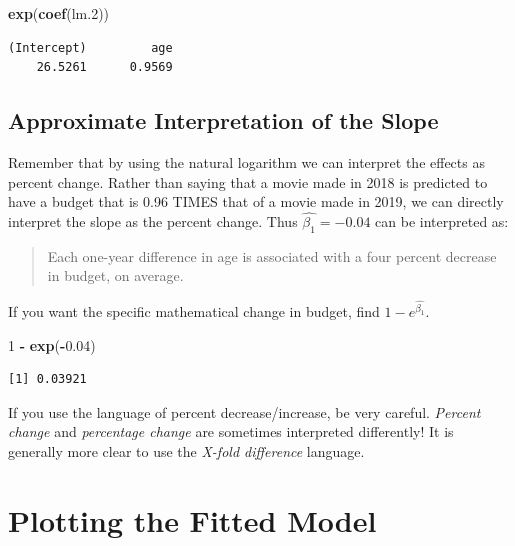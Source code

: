 \documentclass[]{book}
\newenvironment{Shaded}{\begin{snugshade}}{\end{snugshade}}
\newcommand{\DecValTok}[1]{\textcolor[rgb]{0.00,0.00,0.81}{#1}}
\newcommand{\FloatTok}[1]{\textcolor[rgb]{0.00,0.00,0.81}{#1}}
\newcommand{\KeywordTok}[1]{\textcolor[rgb]{0.13,0.29,0.53}{\textbf{#1}}}
\newcommand{\NormalTok}[1]{#1}
\newcommand{\OperatorTok}[1]{\textcolor[rgb]{0.81,0.36,0.00}{\textbf{#1}}}
\newcommand{\StringTok}[1]{\textcolor[rgb]{0.31,0.60,0.02}{#1}}
\begin{document}
\begin{Shaded}
\begin{Highlighting}[]
\KeywordTok{exp}\NormalTok{(}\KeywordTok{coef}\NormalTok{(lm}\FloatTok{.2}\NormalTok{))}
\end{Highlighting}
\end{Shaded}

\begin{verbatim}
(Intercept)         age 
    26.5261      0.9569 
\end{verbatim}

\hypertarget{approximate-interpretation-of-the-slope}{%
\subsection{Approximate Interpretation of the Slope}\label{approximate-interpretation-of-the-slope}}

Remember that by using the natural logarithm we can interpret the effects as percent change. Rather than saying that a movie made in 2018 is predicted to have a budget that is 0.96 TIMES that of a movie made in 2019, we can directly interpret the slope as the percent change. Thus \(\hat{\beta_1}=-0.04\) can be interpreted as:

\begin{quote}
Each one-year difference in age is associated with a four percent decrease in budget, on average.
\end{quote}

If you want the specific mathematical change in budget, find \(1 - e^{\hat{\beta_1}}\).

\begin{Shaded}
\begin{Highlighting}[]
\DecValTok{1} \OperatorTok{-}\StringTok{ }\KeywordTok{exp}\NormalTok{(}\OperatorTok{-}\FloatTok{0.04}\NormalTok{)}
\end{Highlighting}
\end{Shaded}

\begin{verbatim}
[1] 0.03921
\end{verbatim}

If you use the language of percent decrease/increase, be very careful. \emph{Percent change} and \emph{percentage change} are sometimes interpreted differently! It is generally more clear to use the \emph{X-fold difference} language.

\hypertarget{plotting-the-fitted-model-1}{%
\section{Plotting the Fitted Model}\label{plotting-the-fitted-model-1}}
\end{document}
